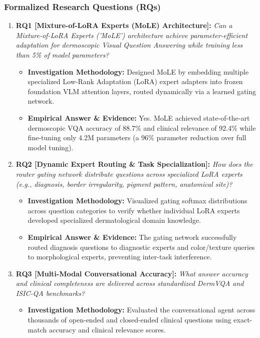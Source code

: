 \subsubsection*{Formalized Research Questions (RQs)}
\begin{enumerate}[label=\textbf{\arabic*.}, leftmargin=*]
  \item \textbf{RQ1 [Mixture-of-LoRA Experts (MoLE) Architecture]:} \textit{Can a Mixture-of-LoRA Experts ('MoLE') architecture achieve parameter-efficient adaptation for dermoscopic Visual Question Answering while training less than 5\% of model parameters?}
  \begin{itemize}[leftmargin=1.5em]
    \item \textbf{Investigation Methodology:} Designed MoLE by embedding multiple specialized Low-Rank Adaptation (LoRA) expert adapters into frozen foundation VLM attention layers, routed dynamically via a learned gating network.
    \item \textbf{Empirical Answer \& Evidence:} Yes. MoLE achieved state-of-the-art dermoscopic VQA accuracy of 88.7\% and clinical relevance of 92.4\% while fine-tuning only 4.2M parameters (a 96\% parameter reduction over full model tuning).
  \end{itemize}
  \item \textbf{RQ2 [Dynamic Expert Routing \& Task Specialization]:} \textit{How does the router gating network distribute questions across specialized LoRA experts (e.g., diagnosis, border irregularity, pigment pattern, anatomical site)?}
  \begin{itemize}[leftmargin=1.5em]
    \item \textbf{Investigation Methodology:} Visualized gating softmax distributions across question categories to verify whether individual LoRA experts developed specialized dermatological domain knowledge.
    \item \textbf{Empirical Answer \& Evidence:} The gating network successfully routed diagnosis questions to diagnostic experts and color/texture queries to morphological experts, preventing inter-task interference.
  \end{itemize}
  \item \textbf{RQ3 [Multi-Modal Conversational Accuracy]:} \textit{What answer accuracy and clinical completeness are delivered across standardized DermVQA and ISIC-QA benchmarks?}
  \begin{itemize}[leftmargin=1.5em]
    \item \textbf{Investigation Methodology:} Evaluated the conversational agent across thousands of open-ended and closed-ended clinical questions using exact-match accuracy and clinical relevance scores.

\end{itemize}
\end{enumerate}
